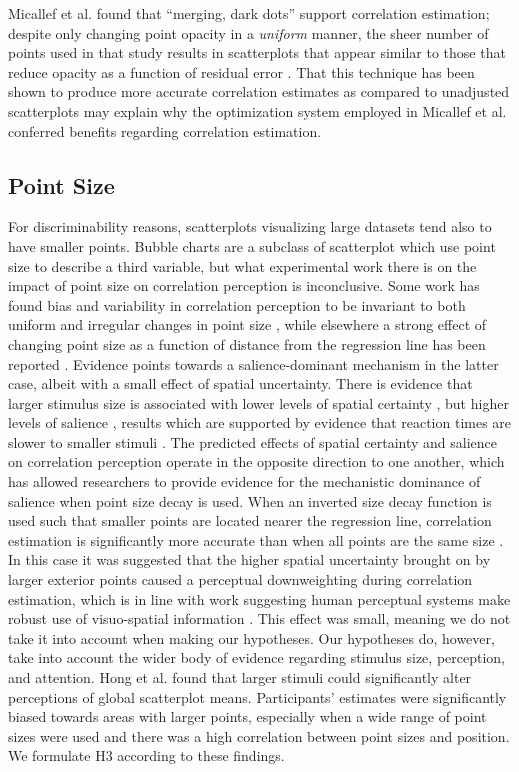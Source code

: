 \documentclass[sigconf]{acmart}
\begin{document}
Micallef et al. \citep{micallef_2017} found that ``merging, dark dots''
support correlation estimation; despite only changing point opacity in a
\emph{uniform} manner, the sheer number of points used in that study
results in scatterplots that appear similar to those that reduce opacity
as a function of residual error \citep{strain_2023}. That this technique
has been shown to produce more accurate correlation estimates as
compared to unadjusted scatterplots may explain why the optimization
system employed in Micallef et al. \citep{micallef_2017} conferred
benefits regarding correlation estimation.

\hypertarget{sec-point-size}{%
\subsection{Point Size}\label{sec-point-size}}

For discriminability reasons, scatterplots visualizing large datasets
tend also to have smaller points. Bubble charts are a subclass of
scatterplot which use point size to describe a third variable, but what
experimental work there is on the impact of point size on correlation
perception is inconclusive. Some work has found bias and variability in
correlation perception to be invariant to both uniform and irregular
changes in point size \citep{rensink_2012, rensink_2014}, while
elsewhere a strong effect of changing point size as a function of
distance from the regression line has been reported
\citep{strain_2023b}. Evidence points towards a salience-dominant
mechanism in the latter case, albeit with a small effect of spatial
uncertainty. There is evidence that larger stimulus size is associated
with lower levels of spatial certainty \citep{alais_2004}, but higher
levels of salience \citep{healey_2011}, results which are supported by
evidence that reaction times are slower to smaller stimuli
\citep{gramazio_2014, osaka_1976}. The predicted effects of spatial
certainty and salience on correlation perception operate in the opposite
direction to one another, which has allowed researchers to provide
evidence for the mechanistic dominance of salience when point size decay
is used. When an inverted size decay function is used such that smaller
points are located nearer the regression line, correlation estimation is
significantly more accurate than when all points are the same size
\citep{strain_2023b}. In this case it was suggested that the higher
spatial uncertainty brought on by larger exterior points caused a
perceptual downweighting during correlation estimation, which is in line
with work suggesting human perceptual systems make robust use of
visuo-spatial information
\citep{strain_2023b, warren_2002, warren_2004}. This effect was small,
meaning we do not take it into account when making our hypotheses. Our
hypotheses do, however, take into account the wider body of evidence
regarding stimulus size, perception, and attention. Hong et al.
\citep{hong_2021} found that larger stimuli could significantly alter
perceptions of global scatterplot means. Participants' estimates were
significantly biased towards areas with larger points, especially when a
wide range of point sizes were used and there was a high correlation
between point sizes and position. We formulate H3 according to these
findings.
\end{document}
